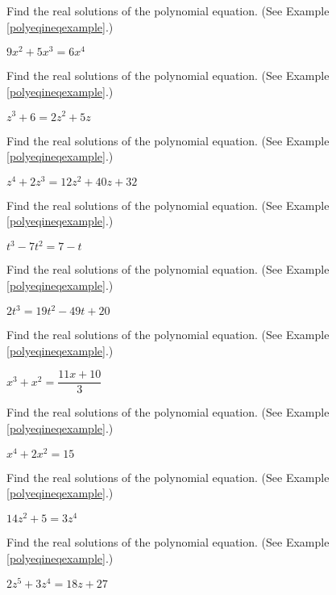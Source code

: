 \documentclass{ximera}
\begin{document}
\begin{problem}
Find the real solutions of the polynomial equation.  (See Example \ref{polyeqineqexample}.)

$9x^{2}+5x^{3}= 6x^{4}$ 
\end{problem} 

\begin{problem}
Find the real solutions of the polynomial equation.  (See Example \ref{polyeqineqexample}.)

$z^{3} + 6 = 2z^{2} + 5z$ 
\end{problem} 

\begin{problem}
Find the real solutions of the polynomial equation.  (See Example \ref{polyeqineqexample}.)

$z^{4} + 2z^{3} = 12z^{2} + 40z + 32$ 
\end{problem} 

\begin{problem}
Find the real solutions of the polynomial equation.  (See Example \ref{polyeqineqexample}.)

$t^{3} - 7t^{2} = 7-t$ 
\end{problem} 

\begin{problem}
Find the real solutions of the polynomial equation.  (See Example \ref{polyeqineqexample}.)

$2t^{3} = 19t^{2} - 49t + 20$ 
\end{problem}  

\begin{problem}
Find the real solutions of the polynomial equation.  (See Example \ref{polyeqineqexample}.)

$x^{3} + x^{2} = \dfrac{11x + 10}{3}$ 
\end{problem} 

\begin{problem}
Find the real solutions of the polynomial equation.  (See Example \ref{polyeqineqexample}.)

$x^4+2x^2 = 15$ 
\end{problem}  

\begin{problem}
Find the real solutions of the polynomial equation.  (See Example \ref{polyeqineqexample}.)

$14z^{2}+5=3z^{4}$ 
\end{problem}   

\begin{problem}\label{polyequexerlast} 
Find the real solutions of the polynomial equation.  (See Example \ref{polyeqineqexample}.)

$2z^5+3z^4 = 18z + 27$ 
\end{problem}  
\end{document}
